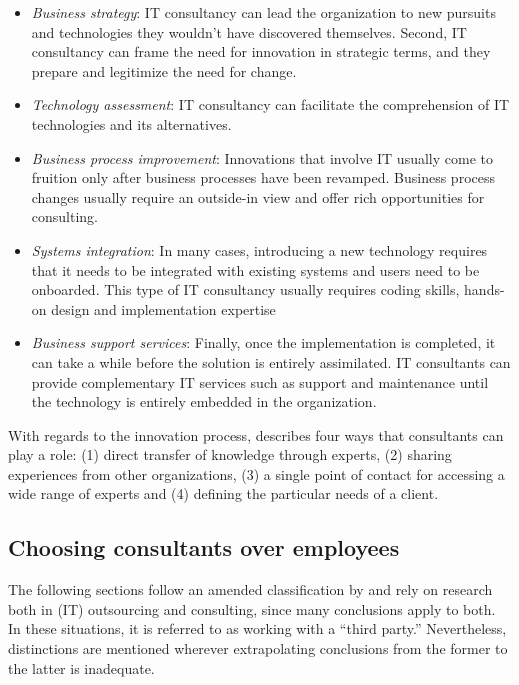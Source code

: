 \documentclass[12pt]{article}
\providecommand{\tightlist}{%
  \setlength{\itemsep}{0pt}\setlength{\parskip}{0pt}}
\begin{document}
\begin{itemize}
\tightlist
\item
  \emph{Business strategy}: IT consultancy can lead the organization to
  new pursuits and technologies they wouldn't have discovered
  themselves. Second, IT consultancy can frame the need for innovation
  in strategic terms, and they prepare and legitimize the need for
  change.
\item
  \emph{Technology assessment}: IT consultancy can facilitate the
  comprehension of IT technologies and its alternatives.
\item
  \emph{Business process improvement}: Innovations that involve IT
  usually come to fruition only after business processes have been
  revamped. Business process changes usually require an outside-in view
  and offer rich opportunities for consulting.
\item
  \emph{Systems integration}: In many cases, introducing a new
  technology requires that it needs to be integrated with existing
  systems and users need to be onboarded. This type of IT consultancy
  usually requires coding skills, hands-on design and implementation
  expertise
\item
  \emph{Business support services}: Finally, once the implementation is
  completed, it can take a while before the solution is entirely
  assimilated. IT consultants can provide complementary IT services such
  as support and maintenance until the technology is entirely embedded
  in the organization.
\end{itemize}

With regards to the innovation process, \citet[101-102]{bessant1995}
describes four ways that consultants can play a role: (1) direct
transfer of knowledge through experts, (2) sharing experiences from
other organizations, (3) a single point of contact for accessing a wide
range of experts and (4) defining the particular needs of a client.

\subsection{Choosing consultants over
employees}\label{choosing-consultants-over-employees}

The following sections follow an amended classification by
\citet{lacity1994} and rely on research both in (IT) outsourcing and
consulting, since many conclusions apply to both. In these situations,
it is referred to as working with a ``third party.'' Nevertheless,
distinctions are mentioned wherever extrapolating conclusions from the
former to the latter is inadequate.
\end{document}
